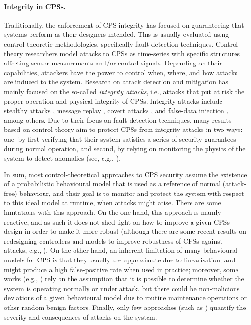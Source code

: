 {\paragraph{Integrity in CPSs.} Traditionally, the enforcement of CPS integrity has focused on guaranteeing that systems perform as their designers intended. This is usually evaluated using {control-theoretic methodologies}, specifically {fault-detection techniques}. Control theory researchers model attacks to CPSs as time-series with specific structures affecting sensor measurements and/or control signals. Depending on their capabilities, attackers have the power to control when, where, and how attacks are induced to the system. Research on attack detection and mitigation has mainly focused on the so-called \emph{integrity attacks}, i.e., attacks that put at risk the proper operation and physical integrity of CPSs. Integrity attacks include stealthy attacks \cite{CPSStealthAttacks}, message replay \cite{CPSReplayAttacks}, covert attacks \cite{CPSCovertAttacks}, and false-data injection \cite{CPSDataInjectionAttacks}, among others. Due to their focus on fault-detection techniques, many results based on control theory aim to protect CPSs from integrity attacks in two ways: one, by first verifying that their system satisfies a series of security guarantees during normal operation, and second, by relying on {monitoring} the physics of the system to detect anomalies (see, e.g., \cite{CPSInvariantsForDetection,LimitingImpactStealthyAttacks,CPSAttackDetection,CPSAttacksAgainstPCS,CPSIntegrityAttacks,CPSDetectingIntegrityAttacksScada}).
}

{%
In sum, most control-theoretical approaches to CPS security assume the existence of a probabilistic behavioural model that is used as a reference of normal (attack-free) behaviour, and their goal is to monitor and protect the system with respect to this ideal model at runtime, when attacks might arise. There are some limitations with this approach. On the one hand, this approach is mainly reactive, and as such it does not shed light on how to improve a given CPSs design in order to make it more robust (although there are some recent results on {redesigning controllers and models} to improve robustness of CPSs against attacks, e.g., \cite{Carlos_Justin3,Weerakkody}). On the other hand, an inherent limitation of many behavioural models for CPS is that they usually are approximate due to linearisation, and might produce a high false-positive rate when used in practice; moreover, some works (e.g., \cite{LimitingImpactStealthyAttacks,CPSDetectingIntegrityAttacksScada,IFCPSSec}) rely on the assumption that it is possible to determine whether the system is operating normally or under attack, but there could be non-malicious deviations of a given behavioural model due to routine maintenance operations or other random benign factors. Finally, only few approaches (such as \cite{IFCPSSec,Gupta2,Carlos_Justin3}) quantify the severity and consequences of attacks on the system.%
}

